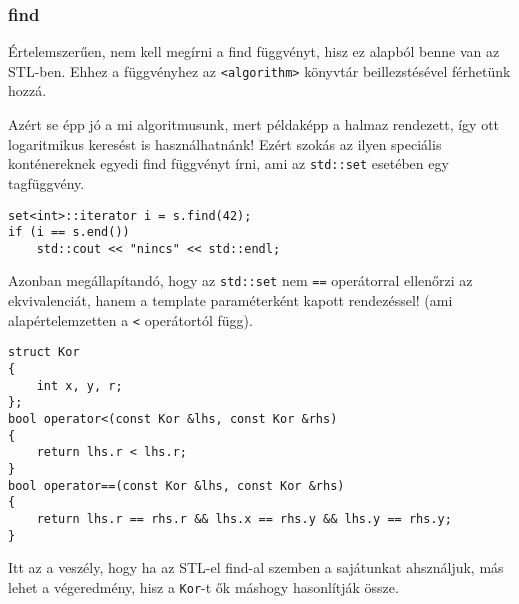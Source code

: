 \documentclass[a4paper,11.5pt]{article}
\begin{document}
	\subsubsection{find}
	Értelemszerűen, nem kell megírni a find függvényt, hisz ez alapból benne van az STL-ben. Ehhez a függvényhez az \texttt{<algorithm>} könyvtár beillezstésével férhetünk hozzá. 
	
	\medskip
	Azért se épp jó a mi algoritmusunk, mert példaképp a halmaz rendezett, így ott logaritmikus keresést is használhatnánk! Ezért szokás az ilyen speciális konténereknek egyedi find függvényt írni, ami az \texttt{std::set} esetében egy tagfüggvény. 
\begin{lstlisting}
set<int>::iterator i = s.find(42);
if (i == s.end())
	std::cout << "nincs" << std::endl;
\end{lstlisting}
	Azonban megállapítandó, hogy az \texttt{std::set} nem \texttt{==} operátorral ellenőrzi az ekvivalenciát, hanem a template paraméterként kapott rendezéssel! (ami alapértelemzetten a \texttt{<} operátortól függ).
\begin{lstlisting}
struct Kor
{
	int x, y, r;
};
bool operator<(const Kor &lhs, const Kor &rhs)
{
	return lhs.r < lhs.r;
}
bool operator==(const Kor &lhs, const Kor &rhs)
{
	return lhs.r == rhs.r && lhs.x == rhs.y && lhs.y == rhs.y;
}
\end{lstlisting}
	Itt az a veszély, hogy ha az STL-el find-al szemben a sajátunkat ahsználjuk, más lehet a végeredmény, hisz a \texttt{Kor}-t ők máshogy hasonlítják össze.
	
\end{document}
